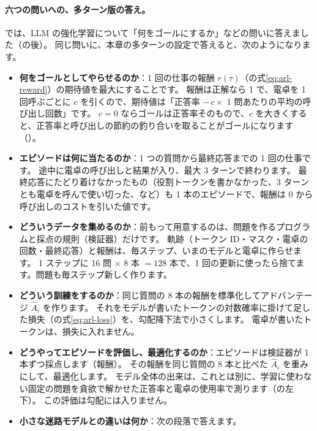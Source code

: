 \paragraph{六つの問いへの、多ターン版の答え。}
では、LLM の強化学習について「何をゴールにするか」などの問いに答えました（の後）。
同じ問いに、本章の多ターンの設定で答えると、次のようになります。
\begin{itemize}
\item \textbf{何をゴールとしてやらせるのか}：1 回の仕事の報酬 $r(\tau)$（の式\eqref{eq:arl-reward}）の期待値を最大にすることです。
報酬は正解なら 1 で、電卓を 1 回呼ぶごとに $c$ を引くので、期待値は「正答率 $-\,c\times$ 1 問あたりの平均の呼び出し回数」です。
$c=0$ ならゴールは正答率そのもので、$c$ を大きくすると、正答率と呼び出しの節約の釣り合いを取ることがゴールになります（）。
\item \textbf{エピソードは何に当たるのか}：1 つの質問から最終応答までの 1 回の仕事です。
途中に電卓の呼び出しと結果が入り、最大 3 ターンで終わります。
最終応答にたどり着けなかったもの（役割トークンを書かなかった、3 ターンとも電卓を呼んで使い切った、など）も 1 本のエピソードで、報酬は 0 から呼び出しのコストを引いた値です。
\item \textbf{どういうデータを集めるのか}：前もって用意するのは、問題を作るプログラムと採点の規則（検証器）だけです。
軌跡（トークン ID・マスク・電卓の回数・最終応答）と報酬は、毎ステップ、いまのモデルと電卓に作らせます。
1 ステップに 16 問 $\times$ 8 本 $=128$ 本で、1 回の更新に使ったら捨てます。問題も毎ステップ新しく作ります。
\item \textbf{どういう訓練をするのか}：同じ質問の 8 本の報酬を標準化してアドバンテージ $\hat A_i$ を作ります。
それをモデルが書いたトークンの対数確率に掛けて足した損失（の式\eqref{eq:arl-loss}）を、勾配降下法で小さくします。
電卓が書いたトークンは、損失に入れません。
\item \textbf{どうやってエピソードを評価し、最適化するのか}：エピソードは検証器が 1 本ずつ採点します（報酬）。
その報酬を同じ質問の 8 本と比べた $\hat A_i$ を重みにして、最適化します。
モデル全体の出来は、これとは別に、学習に使わない固定の問題を貪欲で解かせた正答率と電卓の使用率で測ります（の左下）。
この評価は勾配には入りません。
\item \textbf{小さな迷路モデルとの違いは何か}：次の段落で答えます。
\end{itemize}

